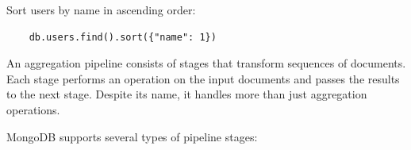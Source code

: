\begin{example}[Sorting]
  \label{ex:sorting}
  Sort users by name in ascending order:
  \begin{lstlisting}
    db.users.find().sort({"name": 1})
  \end{lstlisting}
\end{example}


\begin{definition}
  \label{def:aggregation-pipeline}
  An aggregation pipeline consists of stages that transform sequences of documents. Each stage performs an operation on the input documents and passes the results to the next stage. Despite its name, it handles more than just aggregation operations.
\end{definition}

MongoDB supports several types of pipeline stages:

